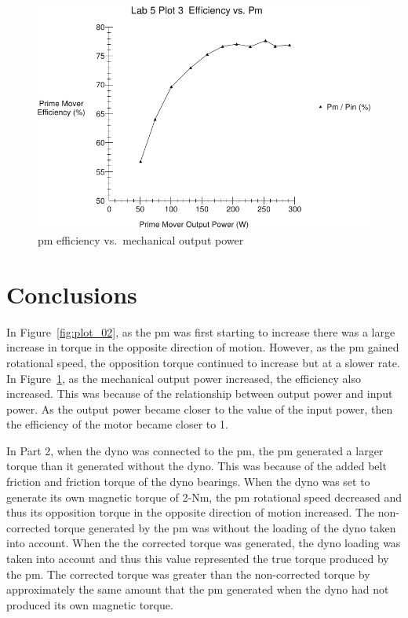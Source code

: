 \documentclass{article}
\begin{document}
\begin{figure}[H]
  \centering
  \includegraphics[width=\textwidth]{img/plot3}
  \caption{\gls{pm} efficiency vs.\ mechanical output power}
  \label{fig:plot_03}
\end{figure}

\section{Conclusions}

In Figure~\ref{fig:plot_02}, as the \gls{pm} was first starting to increase
there was a large increase in torque in the opposite direction of motion.
However, as the \gls{pm} gained rotational speed, the opposition torque
continued to increase but at a slower rate. In Figure~\ref{fig:plot_03}, as the
mechanical output power increased, the efficiency also increased. This was
because of the relationship between output power and input power. As the output
power became closer to the value of the input power, then the efficiency of the
motor became closer to 1.

In Part 2, when the \gls{dyno} was connected to the \gls{pm}, the \gls{pm}
generated a larger torque than it generated without the \gls{dyno}. This was
because of the added belt friction and friction torque of the \gls{dyno}
bearings.  When the \gls{dyno} was set to generate its own magnetic torque of
2-Nm, the \gls{pm} rotational speed decreased and thus its opposition torque in
the opposite direction of motion increased. The non-corrected torque generated
by the \gls{pm} was without the loading of the \gls{dyno} taken into account.
When the the corrected torque was generated, the \gls{dyno} loading was taken
into account and thus this value represented the true torque produced by the
\gls{pm}. The corrected torque was greater than the non-corrected torque by
approximately the same amount that the \gls{pm} generated when the \gls{dyno}
had not produced its own magnetic torque.
\end{document}
